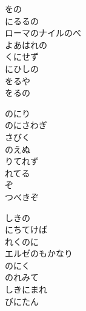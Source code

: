 \documentclass[10pt,b5j]{tarticle} %
\begin{document}
\vspace{1.5em} %
\newcommand{\linespace}{0.5em} %
\newcommand{\blocksize}{0.5\hsize} %
\begin{enumerate} %
    \begin{minipage}[c]{\blocksize}
    
        \vspace{\linespace}
        \item
        をの\\
        にるるの\\
        ローマのナイルのべ\\
        よあはれの\\
        くにせず\\
        にひしの\\
        をるや\\
        をるの
        
        \vspace{\linespace}
        \item
        のにり　\\
        のにさわぎ\\
        さびく　\\
        のえぬ\\
        りてれず\\
        れてる\\
        ぞ\\
        つべきぞ
        
        \vspace{\linespace}
        \item
        しきの\\
        にちてけば\\
        れくのに\\
        エルゼのもかなり\\
        のにく\\
        のれみて\\
        しきにまれ\\
        びにたん
        

\end{minipage}
\end{enumerate}
\end{document}
